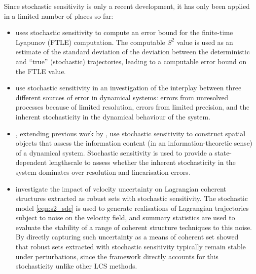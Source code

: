 Since stochastic sensitivity is only a recent development, it has only been applied in a limited number of places so far:
\begin{itemize}
	\item \citet{Balasuriya_2020_UncertaintyFinitetimeLyapunov} uses stochastic sensitivity to compute an error bound for the finite-time Lyapunov (FTLE) computation.
	      The computable \(S^2\) value is used as an estimate of the standard deviation of the deviation between the deterministic and ``true'' (stochastic) trajectories, leading to a computable error bound on the FTLE value.

	\item \citet{FangEtAl_2020_DisentanglingResolutionPrecision} use stochastic sensitivity in an investigation of the interplay between three different sources of error in dynamical systems: errors from unresolved processes because of limited resolution, errors from limited precision, and the inherent stochasticity in the dynamical behaviour of the system.

	\item \citet{FangOuellette_2021_AssessingInformationContent}, extending previous work by \citet{FangEtAl_2019_LocalLinearityCoherent}, use stochastic sensitivity to construct spatial objects that assess the information content (in an information-theoretic sense) of a dynamical system.
	      Stochastic sensitivity is used to provide a state-dependent lengthscale to assess whether the inherent stochasticity in the system dominates over resolution and linearisation errors.

	\item \citet{BadzaEtAl_2023_HowSensitiveAre} investigate the impact of velocity uncertainty on Lagrangian coherent structures extracted as robust sets with stochastic sensitivity.
	      The stochastic model \cref{eqn:s2_sde} is used to generate realisations of Lagrangian trajectories subject to noise on the velocity field, and summary statistics are used to evaluate the stability of a range of coherent structure techniques to this noise.
	      By directly capturing such uncertainty as a means of coherent set \citet{BadzaEtAl_2023_HowSensitiveAre} showed that robust sets extracted with stochastic sensitivity typically remain stable under perturbations, since the framework directly accounts for this stochasticity unlike other LCS methods.

\end{itemize}

